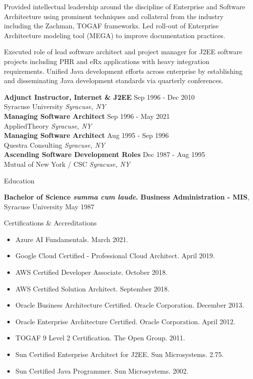 \documentclass{resume} %
\begin{document}
Provided intellectual leadership around the discipline of Enterprise and Software Architecture using prominent techniques and collateral from the industry including the Zachman, TOGAF frameworks. Led roll-out of Enterprise Architecture modeling tool (MEGA) to improve documentation practices.  

Executed role of lead software architect and project manager for J2EE software projects including PHR and eRx applications with heavy integration requirements. Unified Java development efforts across enterprise by establishing and disseminating Java development standards via quarterly conferences.

\textbf{Adjunct Instructor, Internet \& J2EE} \hfill Sep 1996 - Dec 2010\\
Syracuse University \hfill \textit{Syracuse, NY}\\
\textbf{Managing Software Architect} \hfill Sep 1996 - May 2021\\
AppliedTheory \hfill \textit{Syracuse, NY}\\
\textbf{Managing Software Architect} \hfill Aug 1995 - Sep 1996\\
Questra Consulting \hfill \textit{Syracuse, NY}\\
\textbf{Ascending Software Development Roles} \hfill Dec 1987 - Aug 1995\\
Mutual of New York / CSC \hfill \textit{Syracuse, NY}\\

\pagebreak
\begin{rSection}{Education}

{\bf Bachelor of Science \emph{summa cum laude}. Business Administration - MIS}, Syracuse University \hfill {May 1987}\\
\end{rSection}

\begin{rSection}{Certifications \& Accreditations}
\begin{itemize}
   \item Azure AI Fundamentals. March 2021.
   \item Google Cloud Certified - Professional Cloud Architect. April 2019.
   \item AWS Certified Developer Associate. October 2018.
   \item AWS Certified Solution Architect. September 2018.
   \item Oracle Business Architecture Certified. Oracle Corporation. December 2013.
   \item Oracle Enterprise Architecture Certified. Oracle Corporation. April 2012.
   \item TOGAF 9 Level 2 Certification. The Open Group. 2011.
   \item Sun Certified Enterprise Architect for J2EE. Sun Microsystems. 2.75.
   \item Sun Certified Java Programmer. Sun Microsystems. 2002.
\end{itemize}
\end{rSection}
\end{document}
